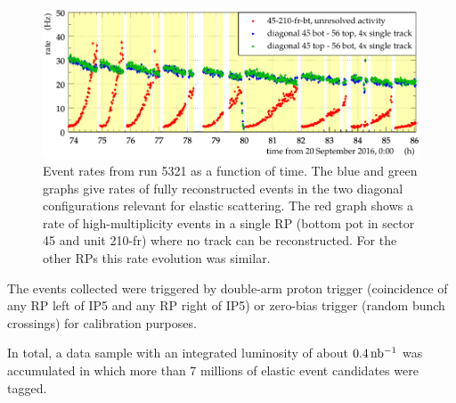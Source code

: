 \begin{figure}
\begin{center}
\includegraphics{fig/rates_vs_time.pdf}
\caption{%
Event rates from run 5321 as a function of time. The blue and green graphs give rates of fully reconstructed events in the two diagonal configurations relevant for elastic scattering. The red graph shows a rate of high-multiplicity events in a single RP (bottom pot in sector 45 and unit 210-fr) where no track can be reconstructed. For the other RPs this rate evolution was similar.
}
\label{fig:rates_vs_time}
\end{center}
\end{figure}

The events collected were triggered by double-arm proton trigger (coincidence of any RP left of IP5 and any RP right of IP5) or zero-bias trigger (random bunch crossings) for calibration purposes.

In total, a data sample with an integrated luminosity of about $0.4\,\rm nb^{-1}$ was accumulated in which more than 7 millions of elastic event candidates were tagged.
